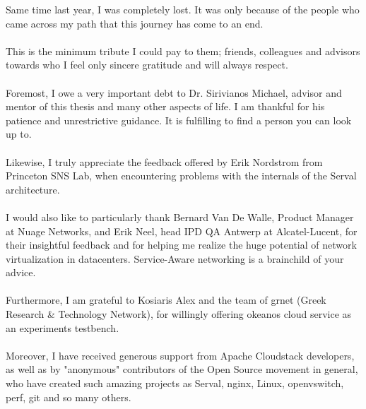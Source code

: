 Same time last year, I was completely lost.
It was only because of the people who came across my path that this journey has come to an end.

\paragraph{}
This is the minimum tribute I could pay to them; friends, colleagues and advisors towards who I feel only sincere gratitude and will always respect.

\paragraph{}
Foremost, I owe a very important debt to Dr. Sirivianos Michael, advisor and mentor of this thesis and many other aspects of life.
I am thankful for his patience and unrestrictive guidance.
It is fulfilling to find a person you can look up to.

\paragraph{}
Likewise, I truly appreciate the feedback offered by Erik Nordstrom from Princeton SNS Lab, when encountering problems with the internals of the Serval architecture.

\paragraph{}
I would also like to particularly thank Bernard Van De Walle, Product Manager at Nuage Networks, and Erik Neel, head IPD QA Antwerp at Alcatel-Lucent, for their insightful feedback and for helping me realize the huge potential of network virtualization in datacenters.
Service-Aware networking is a brainchild of your advice.

\paragraph{}
Furthermore, I am grateful to Kosiaris Alex and the team of grnet (Greek Research \& Technology Network), for willingly offering okeanos cloud service as an experiments testbench.

\paragraph{}
Moreover, I have received generous support from Apache Cloudstack developers, as well as by "anonymous" contributors of the Open Source movement in general, who have created such amazing projects as Serval, nginx, Linux, openvswitch, perf, git and so many others.

